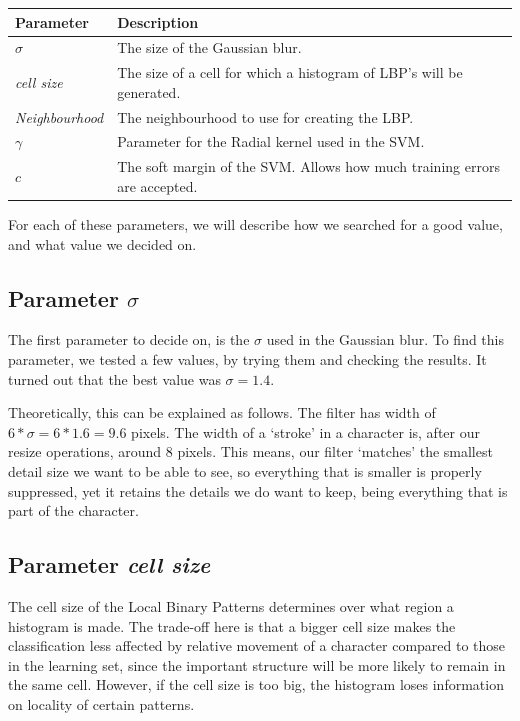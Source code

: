 \documentclass[a4paper]{article}
\begin{document}
\begin{tabular}{l|l}
	Parameter 			& Description \\
	\hline
	$\sigma$  			& The size of the Gaussian blur. \\
	\emph{cell size}	& The size of a cell for which a histogram of LBP's
	                      will be generated. \\
	\emph{Neighbourhood}& The neighbourhood to use for creating the LBP. \\
	$\gamma$			& Parameter for the Radial kernel used in the SVM. \\
	$c$					& The soft margin of the SVM. Allows how much training
						  errors are accepted. \\
\end{tabular}

For each of these parameters, we will describe how we searched for a good
value, and what value we decided on.

\subsection{Parameter $\sigma$}

The first parameter to decide on, is the $\sigma$ used in the Gaussian blur. To
find this parameter, we tested a few values, by trying them and checking the
results. It turned out that the best value was $\sigma = 1.4$.

Theoretically, this can be explained as follows. The filter has width of
$6 * \sigma = 6 * 1.6 = 9.6$ pixels. The width of a `stroke' in a character is,
after our resize operations, around 8 pixels. This means, our filter `matches'
the smallest detail size we want to be able to see, so everything that is
smaller is properly suppressed, yet it retains the details we do want to keep,
being everything that is part of the character.

\subsection{Parameter \emph{cell size}}

The cell size of the Local Binary Patterns determines over what region a
histogram is made. The trade-off here is that a bigger cell size makes the
classification less affected by relative movement of a character compared to
those in the learning set, since the important structure will be more likely to
remain in the same cell. However, if the cell size is too big, the histogram
loses information on locality of certain patterns.
\end{document}
